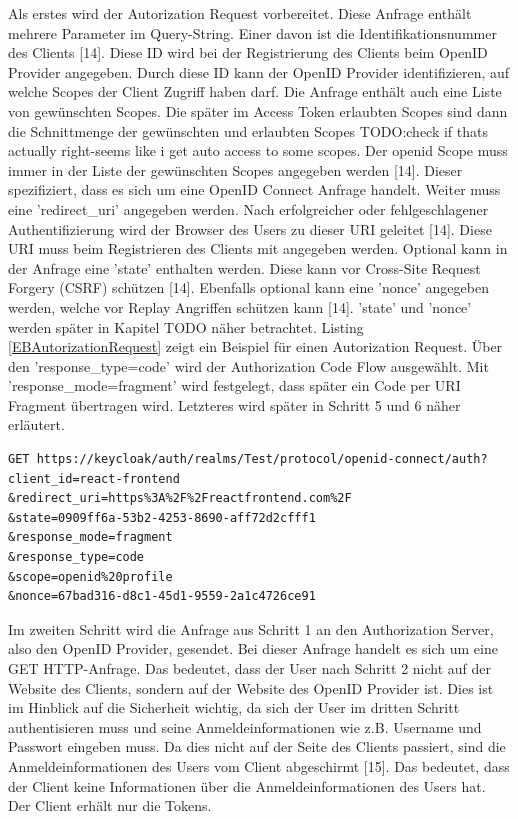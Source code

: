 Als erstes wird der Autorization Request vorbereitet. Diese Anfrage enthält mehrere Parameter im Query-String. Einer davon ist die Identifikationsnummer des Clients [14]. Diese ID wird bei der Registrierung des Clients beim OpenID Provider angegeben. Durch diese ID kann der OpenID Provider identifizieren, auf welche Scopes der Client Zugriff haben darf. Die Anfrage enthält auch eine Liste von gewünschten Scopes. Die später im Access Token erlaubten Scopes sind dann die Schnittmenge der gewünschten und erlaubten Scopes TODO:check if thats actually right-seems like i get auto access to some scopes. Der openid Scope muss immer in der Liste der gewünschten Scopes angegeben werden [14]. Dieser spezifiziert, dass es sich um eine OpenID Connect Anfrage handelt. Weiter muss eine 'redirect\_uri' angegeben werden. Nach erfolgreicher oder fehlgeschlagener Authentifizierung wird der Browser des Users zu dieser URI geleitet [14]. Diese URI muss beim Registrieren des Clients mit angegeben werden. Optional kann in der Anfrage eine 'state' enthalten werden. Diese kann vor Cross-Site Request Forgery (CSRF) schützen [14]. Ebenfalls optional kann eine 'nonce' angegeben werden, welche vor Replay Angriffen schützen kann [14]. 'state' und 'nonce' werden später in Kapitel TODO näher betrachtet. Listing \ref{EBAutorizationRequest} zeigt ein Beispiel für einen Autorization Request. Über den 'response\_type=code' wird der Authorization Code Flow ausgewählt. Mit 'response\_mode=fragment' wird festgelegt, dass später ein Code per URI Fragment übertragen wird. Letzteres wird später in Schritt 5 und 6 näher erläutert.

\begin{lstlisting}[caption=Beispiel Autorization Request, captionpos=b, label=EBAutorizationRequest]
GET https://keycloak/auth/realms/Test/protocol/openid-connect/auth?
client_id=react-frontend
&redirect_uri=https%3A%2F%2Freactfrontend.com%2F
&state=0909ff6a-53b2-4253-8690-aff72d2cfff1
&response_mode=fragment
&response_type=code
&scope=openid%20profile
&nonce=67bad316-d8c1-45d1-9559-2a1c4726ce91
\end{lstlisting}

Im zweiten Schritt wird die Anfrage aus Schritt 1 an den Authorization Server, also den OpenID Provider, gesendet. Bei dieser Anfrage handelt es sich um eine GET HTTP-Anfrage. Das bedeutet, dass der User nach Schritt 2 nicht auf der Website des Clients, sondern auf der Website des OpenID Provider ist. Dies ist im Hinblick auf die Sicherheit wichtig, da sich der User im dritten Schritt authentisieren muss und seine Anmeldeinformationen wie z.B. Username und Passwort eingeben muss. Da dies nicht auf der Seite des Clients passiert, sind die Anmeldeinformationen des Users vom Client abgeschirmt [15]. Das bedeutet, dass der Client keine Informationen über die Anmeldeinformationen des Users hat. Der Client erhält nur die Tokens.

